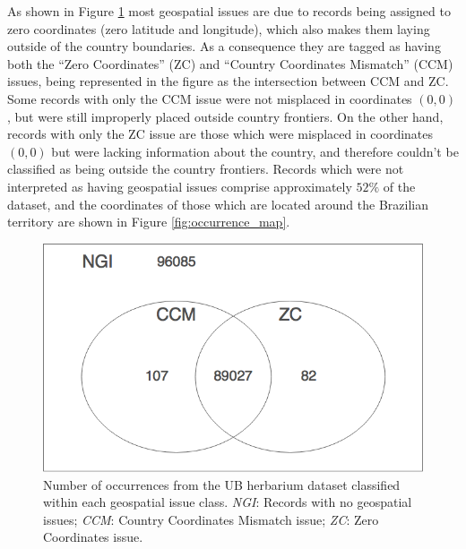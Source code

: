 As shown in Figure \ref{fig:venn_geospatial_issues} most geospatial issues are due to records being assigned to zero coordinates (zero latitude and longitude), which also makes them laying outside of the country boundaries. 
As a consequence they are tagged as having both the ``Zero Coordinates'' (ZC) and ``Country Coordinates Mismatch'' (CCM) issues, being represented in the figure as the intersection between CCM and ZC.
Some records with only the CCM issue were not misplaced in coordinates $(0,0)$, but were still improperly placed outside country frontiers. 
On the other hand, records with only the ZC issue are those which were misplaced in coordinates $(0,0)$ but were lacking information about the country, and therefore couldn't be classified as being outside the country frontiers.
Records which were not interpreted as having geospatial issues comprise approximately $52\%$ of the dataset, and the coordinates of those which are located around the Brazilian territory are shown in Figure \ref{fig:occurrence_map}. 

  \begin{figure}[h!]
  	\centering
    \includegraphics[width=0.6\linewidth]{figures/venn_geospatial_issues.png}
    \caption[Number of occurrences from the UB herbarium dataset classified within each geospatial issue class.]{Number of occurrences from the UB herbarium dataset classified within each geospatial issue class. \textit{NGI}: Records with no geospatial issues; \textit{CCM}: Country Coordinates Mismatch issue; \textit{ZC}: Zero Coordinates issue.}
    \label{fig:venn_geospatial_issues}
  \end{figure}

